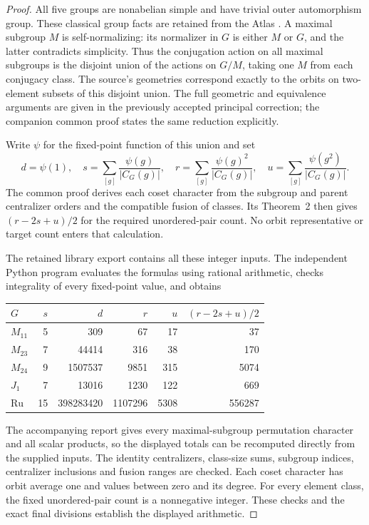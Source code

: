 \documentclass[11pt]{article}
\begin{document}
\begin{proof}
All five groups are nonabelian simple and have trivial outer
automorphism group. These classical group facts are retained from the
Atlas \cite{Atlas}. A maximal subgroup $M$ is self-normalizing: its
normalizer in $G$ is either $M$ or $G$, and the latter contradicts
simplicity. Thus the conjugation action on all maximal subgroups is the
disjoint union of the actions on $G/M$, taking one $M$ from each
conjugacy class. The source's geometries correspond exactly to the
orbits on two-element subsets of this disjoint union. The full
geometric and equivalence arguments are given in the previously accepted
principal correction; the companion common proof states the same
reduction explicitly.

Write $\psi$ for the fixed-point function of this union and set
\[
 d=\psi(1),\quad s=\sum_{[g]}\frac{\psi(g)}{|C_G(g)|},\quad
 r=\sum_{[g]}\frac{\psi(g)^2}{|C_G(g)|},\quad
 u=\sum_{[g]}\frac{\psi(g^2)}{|C_G(g)|}.
\]
The common proof derives each coset character from the subgroup and
parent centralizer orders and the compatible fusion of classes. Its
Theorem~2 then gives $(r-2s+u)/2$ for the required unordered-pair count.
No orbit representative or target count enters that calculation.

The retained library export contains all these integer inputs. The
independent Python program evaluates the formulas using rational
arithmetic, checks integrality of every fixed-point value, and obtains
\begin{center}
\begin{tabular}{lrrrrr}\toprule
$G$ & $s$ & $d$ & $r$ & $u$ & $(r-2s+u)/2$\\\midrule
$M_{11}$ & 5 & 309 & 67 & 17 & 37\\
$M_{23}$ & 7 & 44414 & 316 & 38 & 170\\
$M_{24}$ & 9 & 1507537 & 9851 & 315 & 5074\\
$J_1$ & 7 & 13016 & 1230 & 122 & 669\\
$\mathrm{Ru}$ & 15 & 398283420 & 1107296 & 5308 & 556287\\\bottomrule
\end{tabular}
\end{center}
The accompanying report gives every maximal-subgroup permutation
character and all scalar products, so the displayed totals can be
recomputed directly from the supplied inputs. The identity centralizers,
class-size sums, subgroup indices, centralizer inclusions and fusion
ranges are checked. Each coset character has orbit average one and
values between zero and its degree. For every element class, the
fixed unordered-pair count is a nonnegative integer. These checks and
the exact final divisions establish the displayed arithmetic.
\end{proof}
\end{document}
